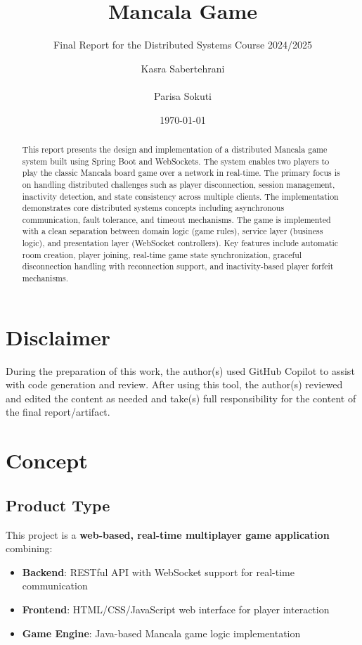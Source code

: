 \documentclass{scrartcl}
\title{\LARGE Mancala Game}
\subtitle{Final Report for the Distributed Systems Course 2024/2025}
\author{
  Kasra Sabertehrani \\ \emailaddr{kasra.sabertehrani@studio.unibo.it} \\
    Parisa Sokuti \\ \emailaddr{parisa.sokuti@studio.unibo.it}
}
\date{\today}
\begin{document}
\maketitle

\begin{abstract}
This report presents the design and implementation of a distributed Mancala game system built using Spring Boot and WebSockets.
The system enables two players to play the classic Mancala board game over a network in real-time.
The primary focus is on handling distributed challenges such as player disconnection, session management, inactivity detection,
and state consistency across multiple clients.
The implementation demonstrates core distributed systems concepts including asynchronous communication,
fault tolerance, and timeout mechanisms.
The game is implemented with a clean separation between domain logic (game rules), service layer (business logic),
and presentation layer (WebSocket controllers).
Key features include automatic room creation, player joining, real-time game state synchronization,
graceful disconnection handling with reconnection support, and inactivity-based player forfeit mechanisms.
\end{abstract}

\section*{Disclaimer}

During the preparation of this work, the author(s) used GitHub Copilot to assist with code generation and review.
After using this tool, the author(s) reviewed and edited the content as needed and take(s) full responsibility for the content of the final report/artifact.

\section{Concept}\label{concept}

\subsection{Product Type}

This project is a \textbf{web-based, real-time multiplayer game application} combining:
\begin{itemize}
  \item \textbf{Backend}: RESTful API with WebSocket support for real-time communication
  \item \textbf{Frontend}: HTML/CSS/JavaScript web interface for player interaction
  \item \textbf{Game Engine}: Java-based Mancala game logic implementation
\end{itemize}
\end{document}
